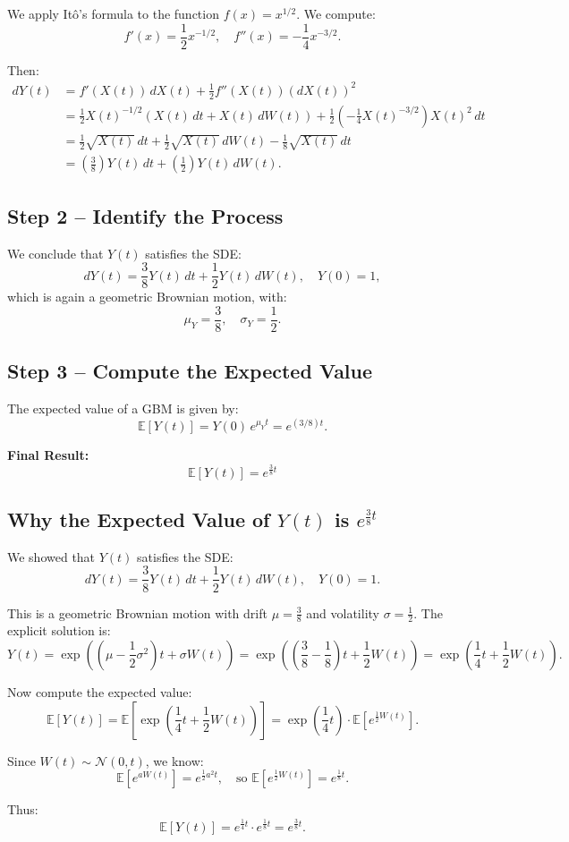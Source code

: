 We apply Itô's formula to the function \( f(x) = x^{1/2} \). We compute:
\[
f'(x) = \frac{1}{2} x^{-1/2}, \quad f''(x) = -\frac{1}{4} x^{-3/2}.
\]

Then:
\[
\begin{aligned}
dY(t) &= f'(X(t))\,dX(t) + \frac{1}{2} f''(X(t)) (dX(t))^2 \\
&= \frac{1}{2} X(t)^{-1/2} \left( X(t)\,dt + X(t)\,dW(t) \right) 
+ \frac{1}{2} \left( -\frac{1}{4} X(t)^{-3/2} \right) X(t)^2\,dt \\
&= \frac{1}{2} \sqrt{X(t)}\,dt + \frac{1}{2} \sqrt{X(t)}\,dW(t) 
- \frac{1}{8} \sqrt{X(t)}\,dt \\
&= \left( \frac{3}{8} \right) Y(t)\,dt + \left( \frac{1}{2} \right) Y(t)\,dW(t).
\end{aligned}
\]

\subsection*{Step 2 – Identify the Process}

We conclude that \( Y(t) \) satisfies the SDE:
\[
dY(t) = \frac{3}{8} Y(t)\,dt + \frac{1}{2} Y(t)\,dW(t), \quad Y(0) = 1,
\]
which is again a geometric Brownian motion, with:
\[
\mu_Y = \frac{3}{8}, \quad \sigma_Y = \frac{1}{2}.
\]

\subsection*{Step 3 – Compute the Expected Value}

The expected value of a GBM is given by:
\[
\mathbb{E}[Y(t)] = Y(0)\,e^{\mu_Y t} = e^{(3/8)t}.
\]

\textbf{Final Result:}
\[
\boxed{ \mathbb{E}[Y(t)] = e^{\frac{3}{8} t} }
\]
\subsection*{Why the Expected Value of \( Y(t) \) is \( e^{\frac{3}{8}t} \)}

We showed that \( Y(t) \) satisfies the SDE:
\[
dY(t) = \frac{3}{8} Y(t)\,dt + \frac{1}{2} Y(t)\,dW(t), \quad Y(0) = 1.
\]

This is a geometric Brownian motion with drift \( \mu = \frac{3}{8} \) and volatility \( \sigma = \frac{1}{2} \). The explicit solution is:
\[
Y(t) = \exp\left( \left( \mu - \frac{1}{2} \sigma^2 \right)t + \sigma W(t) \right)
= \exp\left( \left( \frac{3}{8} - \frac{1}{8} \right)t + \frac{1}{2} W(t) \right)
= \exp\left( \frac{1}{4}t + \frac{1}{2} W(t) \right).
\]

Now compute the expected value:
\[
\mathbb{E}[Y(t)] = \mathbb{E}\left[ \exp\left( \frac{1}{4}t + \frac{1}{2} W(t) \right) \right]
= \exp\left( \frac{1}{4}t \right) \cdot \mathbb{E}\left[ e^{\frac{1}{2} W(t)} \right].
\]

Since \( W(t) \sim \mathcal{N}(0, t) \), we know:
\[
\mathbb{E}[e^{a W(t)}] = e^{\frac{1}{2} a^2 t},
\quad \text{so } \mathbb{E}[e^{\frac{1}{2} W(t)}] = e^{\frac{1}{8} t}.
\]

Thus:
\[
\mathbb{E}[Y(t)] = e^{\frac{1}{4}t} \cdot e^{\frac{1}{8}t} = \boxed{e^{\frac{3}{8}t}}.
\]